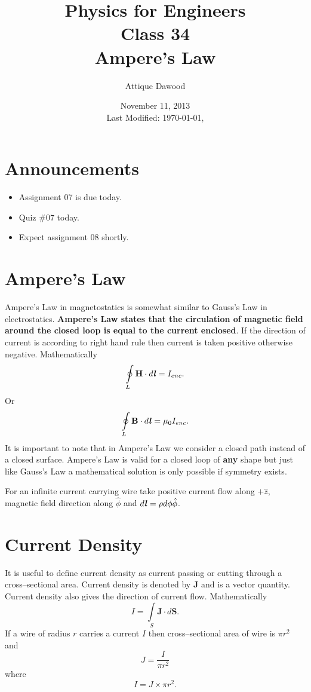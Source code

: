 \documentclass[12pt,a4paper]{article}
\title{\vspace{-3cm}Physics for Engineers\\Class 34\\Ampere's Law}
\author{Attique Dawood}
\date{November 11, 2013\\[0.2cm] Last Modified: \today, \currenttime}
\begin{document}
\maketitle
\section{Announcements}
\begin{itemize}
\item Assignment 07 is due today.
\item Quiz \#07 today.
\item Expect assignment 08 shortly.
\end{itemize}
\section{Ampere's Law}
Ampere's Law in magnetostatics is somewhat similar to Gauss's Law in electrostatics. \textbf{Ampere's Law states that the circulation of magnetic field around the closed loop is equal to the current enclosed}. If the direction of current is according to right hand rule then current is taken positive otherwise negative. Mathematically
\begin{equation}
\oint\limits_{L}\textbf{H}\cdot d\textbf{\textit{l}}=I_{enc}.
\end{equation}
Or
\begin{equation}
\oint\limits_{L}\textbf{B}\cdot d\textbf{\textit{l}}=\mu_0I_{enc}.
\end{equation}
It is important to note that in Ampere's Law we consider a closed path instead of a closed surface. Ampere's Law is valid for a closed loop of \textbf{any} shape but just like Gauss's Law a mathematical solution is only possible if symmetry exists.

For an infinite current carrying wire take positive current flow along $+\hat z$, magnetic field direction along $\hat \phi$ and $d\textbf{\textit{l}}=\rho d\phi\hat\phi$.
\section{Current Density}
It is useful to define current density as current passing or cutting through a cross--sectional area. Current density is denoted by \textbf{J} and is a vector quantity. Current density also gives the direction of current flow. Mathematically
\begin{equation}
I=\int\limits_{S}\textbf{J}\cdot d{\textbf{S}}.
\end{equation}
If a wire of radius $r$ carries a current $I$ then cross--sectional area of wire is $\pi r^2$ and
\begin{equation}
J=\dfrac{I}{\pi r^2}
\end{equation}
where
\begin{equation}
I=J\times\pi r^2.
\end{equation}
\newpage
\end{document}
